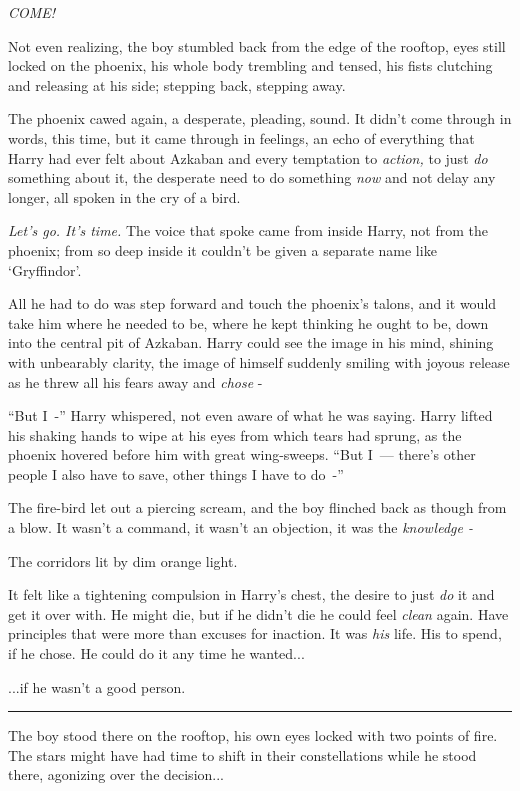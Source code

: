 \emph{COME!}

Not even realizing, the boy stumbled back from the edge of the rooftop, eyes still locked on the phoenix, his whole body trembling and tensed, his fists clutching and releasing at his side; stepping back, stepping away.

The phoenix cawed again, a desperate, pleading, sound. It didn't come through in words, this time, but it came through in feelings, an echo of everything that Harry had ever felt about Azkaban and every temptation to \emph{action,} to just \emph{do} something about it, the desperate need to do something \emph{now} and not delay any longer, all spoken in the cry of a bird.

\emph{Let's go. It's time.} The voice that spoke came from inside Harry, not from the phoenix; from so deep inside it couldn't be given a separate name like `Gryffindor'.

All he had to do was step forward and touch the phoenix's talons, and it would take him where he needed to be, where he kept thinking he ought to be, down into the central pit of Azkaban. Harry could see the image in his mind, shining with unbearably clarity, the image of himself suddenly smiling with joyous release as he threw all his fears away and \emph{chose} -

``But I~-'' Harry whispered, not even aware of what he was saying. Harry lifted his shaking hands to wipe at his eyes from which tears had sprung, as the phoenix hovered before him with great wing-sweeps. ``But I~--- there's other people I also have to save, other things I have to do~-''

The fire-bird let out a piercing scream, and the boy flinched back as though from a blow. It wasn't a command, it wasn't an objection, it was the \emph{knowledge -}

The corridors lit by dim orange light.

It felt like a tightening compulsion in Harry's chest, the desire to just \emph{do} it and get it over with. He might die, but if he didn't die he could feel \emph{clean} again. Have principles that were more than excuses for inaction. It was \emph{his} life. His to spend, if he chose. He could do it any time he wanted...

...if he wasn't a good person.

\begin{center}\rule{3in}{0.4pt}\end{center}

The boy stood there on the rooftop, his own eyes locked with two points of fire. The stars might have had time to shift in their constellations while he stood there, agonizing over the decision...

